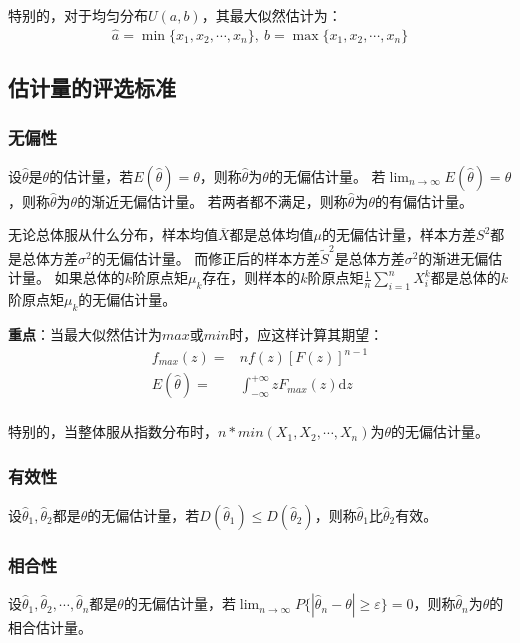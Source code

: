 \documentclass[a4paper,12pt]{ctexart}
\begin{document}
特别的，对于均匀分布$U(a,b)$，其最大似然估计为：
\begin{equation*}
	\hat{a} = \min\{x_1,x_2,\cdots,x_n\},\ \hat{b} = \max\{x_1,x_2,\cdots,x_n\}
\end{equation*}

\subsection{估计量的评选标准}

\subsubsection{无偏性}

设$\hat{\theta}$是$\theta$的估计量，若$E(\hat{\theta}) = \theta$，则称$\hat{\theta}$为$\theta$的无偏估计量。
若$\lim_{n\rightarrow\infty}E(\hat{\theta}) = \theta$，则称$\hat{\theta}$为$\theta$的渐近无偏估计量。
若两者都不满足，则称$\hat{\theta}$为$\theta$的有偏估计量。

无论总体服从什么分布，样本均值$\overline{X}$都是总体均值$\mu$的无偏估计量，样本方差$S^2$都是总体方差$\sigma^2$的无偏估计量。
而修正后的样本方差$\widetilde{S}^2$是总体方差$\sigma^2$的渐进无偏估计量。
如果总体的$k$阶原点矩$\mu_k$存在，则样本的$k$阶原点矩$\frac{1}{n}\sum_{i=1}^nX_i^k$都是总体的$k$阶原点矩$\mu_k$的无偏估计量。

\textbf{重点}：当最大似然估计为$max$或$min$时，应这样计算其期望：
\begin{align*}
	f_{max}(z) =& nf(z)[F(z)]^{n-1} \\
	E(\hat{\theta}) =& \int_{-\infty}^{+\infty}zF_{max}(z)\mathrm{d}z \\
\end{align*}

特别的，当整体服从指数分布时，$n * min(X_1,X_2,\cdots,X_n)$为$\theta$的无偏估计量。

\subsubsection{有效性}

设$\hat{\theta}_1,\hat{\theta}_2$都是$\theta$的无偏估计量，若$D(\hat{\theta}_1) \leq D(\hat{\theta}_2)$，则称$\hat{\theta}_1$比$\hat{\theta}_2$有效。

\subsubsection{相合性}

设$\hat{\theta}_1,\hat{\theta}_2,\cdots,\hat{\theta}_n$都是$\theta$的无偏估计量，若$\lim_{n\rightarrow\infty} P\{|\hat{\theta}_n - \theta| \geq \varepsilon\} = 0$，则称$\hat{\theta}_n$为$\theta$的相合估计量。
\end{document}
